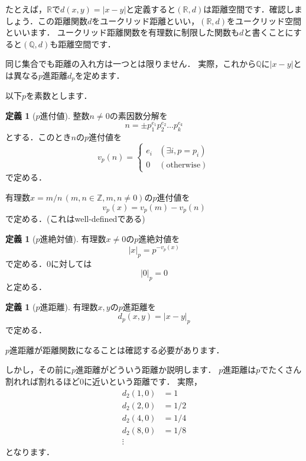 \documentclass[uplatex]{jsarticle}
\newcommand{\Z}{\mathbb{Z}}
\newcommand{\Q}{\mathbb{Q}}
\newcommand{\R}{\mathbb{R}}
\theoremstyle{definition} %
\newtheorem{defi}[thm]{定義}
\begin{document}
たとえば，$\R$で$d(x, y) = |x - y|$と定義すると$(\R, d)$は距離空間です．確認しましょう．この距離関数$d$をユークリッド距離といい，$(\R, d)$をユークリッド空間といいます．
ユークリッド距離関数を有理数に制限した関数も$d$と書くことにすると$(\Q, d)$も距離空間です．

同じ集合でも距離の入れ方は一つとは限りません．
実際，これから$\Q$に$|x - y|$とは異なる$p$進距離$d_p$を定めます．

以下$p$を素数とします．

\begin{oframed}\begin{defi}[$p$進付値]
整数$n \ne 0$の素因数分解を
\[n = \pm p_1^{e_1} p_2^{e_2} \dots p_k^{e_k}\]
とする．このとき$n$の$p$進付値を
\[v_p(n) = \begin{cases}e_i & (\exists i, p = p_i) \\ 0 & (\text{otherwise}) \end{cases} \]
で定める．

有理数$x = m/n\,(m,n \in \Z, m, n \ne 0)$の$p$進付値を
\[v_p(x) = v_p(m) - v_p(n)\]
で定める．(これはwell-definedである)
\end{defi}\end{oframed}

\begin{oframed}\begin{defi}[$p$進絶対値]
有理数$x \ne 0$の$p$進絶対値を
\[|x|_p = p^{-v_p(x)}\]
で定める．$0$に対しては
\[|0|_p = 0\]
と定める．
\end{defi}\end{oframed}

\begin{oframed}\begin{defi}[$p$進距離]
有理数$x, y$の$p$進距離を
\[d_p(x, y) = |x - y|_p\]
で定める．
\end{defi}\end{oframed}

$p$進距離が距離関数になることは確認する必要があります．

しかし，その前に$p$進距離がどういう距離か説明します．
$p$進距離は$p$でたくさん割れれば割れるほど$0$に近いという距離です．
実際，
\begin{align*}
d_2(1, 0) &= 1 \\
d_2(2, 0) &= 1/2 \\
d_2(4, 0) &= 1/4 \\
d_2(8, 0) &= 1/8 \\
\vdots
\end{align*}
となります．
\end{document}
